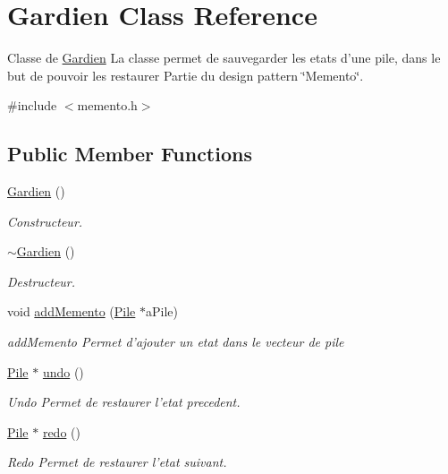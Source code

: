 \hypertarget{class_gardien}{\section{Gardien Class Reference}
\label{class_gardien}
}


Classe de \hyperlink{class_gardien}{Gardien} La classe permet de sauvegarder les etats d'une pile, dans le but de pouvoir les restaurer Partie du design pattern \char`\"{}\-Memento\char`\"{}.  




{\ttfamily \#include $<$memento.\-h$>$}

\subsection*{Public Member Functions}
\begin{DoxyCompactItemize}
\item 
\hyperlink{class_gardien_aab8526f0f25e03d4cb1babbc1aa6d09e}{Gardien} ()
\begin{DoxyCompactList}\small\item\em Constructeur. \end{DoxyCompactList}\item 
\hypertarget{class_gardien_afef6202d924fef9d882bb40dfc4ac9fb}{\hyperlink{class_gardien_afef6202d924fef9d882bb40dfc4ac9fb}{$\sim$\-Gardien} ()}\label{class_gardien_afef6202d924fef9d882bb40dfc4ac9fb}

\begin{DoxyCompactList}\small\item\em Destructeur. \end{DoxyCompactList}\item 
void \hyperlink{class_gardien_ab152ac41cab1dc3f3a1dc0f143a54aa3}{add\-Memento} (\hyperlink{class_pile}{Pile} $\ast$a\-Pile)
\begin{DoxyCompactList}\small\item\em add\-Memento Permet d'ajouter un etat dans le vecteur de pile \end{DoxyCompactList}\item 
\hyperlink{class_pile}{Pile} $\ast$ \hyperlink{class_gardien_ac0145da9f36f0dbf7a6894723249dd1f}{undo} ()
\begin{DoxyCompactList}\small\item\em Undo Permet de restaurer l'etat precedent. \end{DoxyCompactList}\item 
\hyperlink{class_pile}{Pile} $\ast$ \hyperlink{class_gardien_a9fa7f0b6196b9b551b9ff9506d9ef8bf}{redo} ()
\begin{DoxyCompactList}\small\item\em Redo Permet de restaurer l'etat suivant. \end{DoxyCompactList}\end{DoxyCompactItemize}


